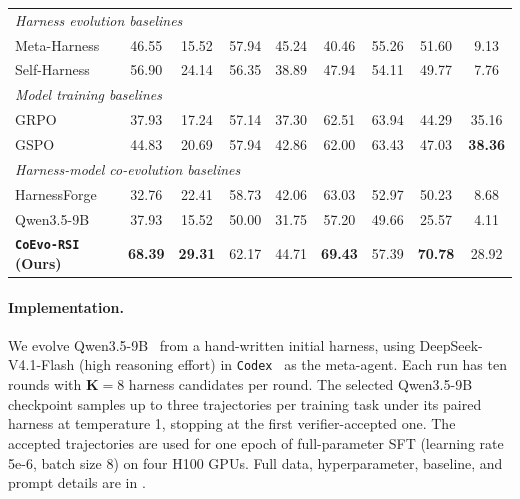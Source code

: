 \documentclass[11pt,a4paper]{article}
\newcommand{\ourmethod}{\texttt{CoEvo-RSI}}
\begin{document}
\begin{table}[!t]
{\begin{tabular}{lcccccccc}
\midrule
\multicolumn{9}{l}{\textit{Harness evolution baselines}} \\
Meta-Harness
& 46.55 & 15.52 & 57.94 & 45.24
& 40.46 & 55.26 & 51.60 & 9.13 \\
Self-Harness
& 56.90 & 24.14 & 56.35 & 38.89
& 47.94 & 54.11 & 49.77 & 7.76 \\

\midrule
\multicolumn{9}{l}{\textit{Model training baselines}} \\
GRPO
& 37.93 & 17.24 & 57.14 & 37.30
& 62.51 & 63.94 & 44.29 & \cellcolor{gray!15}35.16 \\
GSPO
& 44.83 & 20.69 & 57.94 & 42.86
& 62.00 & 63.43 & 47.03 & \cellcolor{highlightblue}\textbf{38.36} \\

\midrule
\multicolumn{9}{l}{\textit{Harness-model co-evolution baselines}} \\
HarnessForge & 32.76 & 22.41 & 58.73 & 42.06 & 63.03 & 52.97 & 50.23 & 8.68\\

\midrule
Qwen3.5-9B
& 37.93 & 15.52 & 50.00 & 31.75
& 57.20 & 49.66 & 25.57 & 4.11 \\
\textbf{\ourmethod{} (Ours)}
& \cellcolor{highlightblue}\textbf{68.39} & \cellcolor{highlightblue}\textbf{29.31} & 62.17 & 44.71
& \cellcolor{highlightblue}\textbf{69.43} & 57.39 & \cellcolor{highlightblue}\textbf{70.78} & 28.92\\

\bottomrule
\end{tabular}
}
\end{table}



\paragraph{Implementation.}
We evolve Qwen3.5-9B~\citep{qwen2026qwen35} from a hand-written initial harness, using DeepSeek-V4.1-Flash (high reasoning effort) in \texttt{Codex}~\citep{openai2025codex} as the meta-agent. Each run has ten rounds with $\mathbf{K}{=}8$ harness candidates per round. The selected Qwen3.5-9B checkpoint samples up to three trajectories per training task under its paired harness at temperature 1, stopping at the first verifier-accepted one. The accepted trajectories are used for one epoch of full-parameter SFT (learning rate 5e-6, batch size 8) on four H100 GPUs. Full data, hyperparameter, baseline, and prompt details are in .
\end{document}
